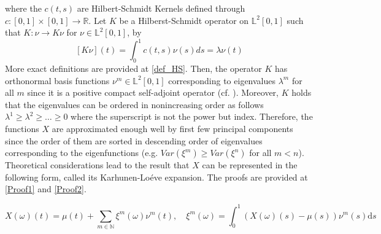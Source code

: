 \documentclass[11pt,twoside,a4paper]{article}
\begin{document}
	where the $c(t,s)$ are Hilbert-Schmidt Kernels defined through $c : [0,1] \times [0,1] \rightarrow \mathbb{R}$. Let $K$ be a Hilberst-Schmidt operator on $\mathbb{L}^{2}[0,1]$ such that $K : \nu \rightarrow K \nu$ for $\nu \in \mathbb{L}^{2}[0,1]$, by
	\begin{equation}\label{HSKernal}
		[K \nu](t) = \int_{0}^{1}c(t,s) \nu(s)ds = \lambda \nu(t)
	\end{equation}
	More exact definitions are provided at \ref{def_HS}. Then, the operator $K$ has orthonormal basis functions $\nu^{m} \in \mathbb{L}^{2}[0,1]$ corresponding to eigenvalues $\lambda^{m}$ for all $m$ since it is a positive compact self-adjoint operator (cf. \cite{alexanderian_KLexpansion_2015}). Moreover, $K$ holds that the eigenvalues can be ordered in nonincreasing order as follows $\lambda^{1} \geq \lambda^{2} \geq \dots \geq 0$ where the superscript is not the power but index. Therefore, the functions $X$ are approximated enough well by first few principal components since the order of them are sorted in descending order of eigenvalues corresponding to the eigenfunctions (e.g. $Var(\xi^{m}) \geq Var(\xi^{n})$ for all $m < n$). Theoretical considerations lead to the result that $X$ can be represented in the following form, called its Karhunen-Lo\'{e}ve expansion. The proofs are provided at \ref{Proof1} and \ref{Proof2}.
	
	
	\begin{equation}\label{KarhunenLoeve}
		X(\omega)(t) = \mu(t) + \sum_{m \in \mathbb{N}} \xi^m(\omega) \nu^m(t), \quad \xi^m(\omega) =  \int_{0}^{1} \left(X(\omega)(s) - \mu(s)\right) \nu^m(s) \mathrm{d}s
	\end{equation}
	
\end{document}
